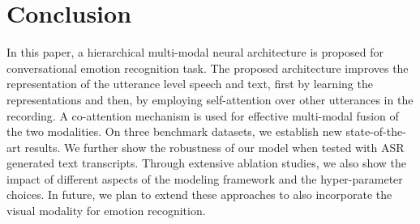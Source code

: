 \documentclass[lettersize,journal]{IEEEtran}
\begin{document}
\section{Conclusion}\label{conclude}
In this paper, a hierarchical multi-modal neural architecture is proposed for conversational emotion recognition task. The proposed architecture improves the representation of the utterance level speech and text, first by learning the representations and then, by employing self-attention over other utterances in the recording. A co-attention mechanism is used for effective multi-modal fusion of the two modalities. On three benchmark datasets, we establish new state-of-the-art results. We further show the robustness of our model when tested with ASR generated text transcripts. Through extensive ablation studies, we also show the impact of different aspects of the modeling framework and the hyper-parameter choices. In future, we plan to extend these approaches to also incorporate the visual modality for emotion recognition. 





















\vfill
\end{document}
